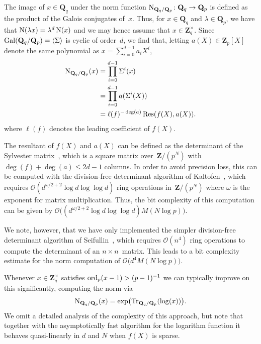 The image of $x \in \mathbf{Q}_q$ under the norm function 
$\operatorname{N}_{\mathbf{Q}_q/\mathbf{Q}_p} \colon \mathbf{Q}_q \rightarrow \mathbf{Q}_p$ 
is defined as the product of the Galois conjugates of~$x$.  Thus, for 
$x \in \mathbf{Q}_q$ and $\lambda \in \mathbf{Q}_p$, we have that 
$\operatorname{N}(\lambda x) = \lambda^d \operatorname{N}(x)$ and we may hence assume that 
$x \in \mathbf{Z}_q^{\times}$.  Since 
$\operatorname{Gal}(\mathbf{Q}_q/\mathbf{Q}_p) = \langle \Sigma \rangle$ is cyclic 
of order~$d$, we find that, letting $a(X) \in \mathbf{Z}_p[X]$ denote 
the same polynomial as $x = \sum_{i=0}^{d-1} a_i X^i$, 
\begin{equation}
\begin{split}
\operatorname{N}_{\mathbf{Q}_q/\mathbf{Q}_p} (x) & = \prod_{i=0}^{d-1} \Sigma^i (x) \\
                                      & = \prod_{i=0}^{d-1} a(\Sigma^i(X)) \\
                                      & = \ell(f)^{- \deg(a)} \operatorname{Res}(f(X), a(X)).
\end{split}
\end{equation}
where $\ell(f)$ denotes the leading coefficient of $f(X)$.  

The resultant of $f(X)$ and $a(X)$ can be defined as the 
determinant of the Sylvester matrix~\citep[Lemma~3.3.4]{Coh93}, which is a 
square matrix over~$\mathbf{Z} / (p^N)$ with $\deg(f) + \deg(a) \leq 2d - 1$ 
columns. In order to avoid precision loss, this can be computed with the 
division-free determinant algorithm of Kaltofen~\citep{Kaltofen1992}, which 
requires $\mathcal{O}(d^{\omega/2 + 2} \log d \log \log d)$ ring operations 
in~$\mathbf{Z} / (p^N)$ where $\omega$ is the exponent for matrix multiplication.
Thus, the bit complexity of this computation can be given by 
$\mathcal{O}\bigl((d^{\omega/2 + 2} \log d \log \log d) M(N \log p)\bigr)$.

We note, however, that we have only implemented the simpler division-free 
determinant algorithm of Seifullin~\citep[Algorithm~4.2]{Seifullin2002}, 
which requires $\mathcal{O}(n^4)$ ring operations to compute the 
determinant of an $n \times n$~matrix.  This leads to a bit complexity 
estimate for the norm computation of $\mathcal{O}\bigl(d^4 M(N \log p)\bigr)$.

Whenever $x \in \mathbf{Z}_q^{\times}$ satisfies $\operatorname{ord}_p(x-1) > (p-1)^{-1}$ 
we can typically improve on this significantly, computing the norm via
\begin{equation}
\operatorname{N}_{\mathbf{Q}_q / \mathbf{Q}_p} (x) 
= \exp \bigl(\operatorname{Tr}_{\mathbf{Q}_q / \mathbf{Q}_p} (\log (x))\bigr).
\end{equation}
We omit a detailed analysis of the complexity of this approach, but note 
that together with the asymptotically fast algorithm for the logarithm 
function it behaves quasi-linearly in $d$ and $N$ when $f(X)$ is sparse.


